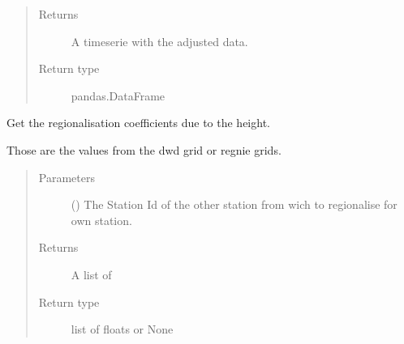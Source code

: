 \documentclass[letterpaper,10pt,english]{sphinxmanual}
\begin{document}
\begin{fulllineitems}
\begin{fulllineitems}
\begin{quote}
\begin{description}
\begin{itemize}
\end{itemize}

\item[{Returns}] \leavevmode
\sphinxAtStartPar
A timeserie with the adjusted data.

\item[{Return type}] \leavevmode
\sphinxAtStartPar
pandas.DataFrame

\end{description}\end{quote}

\end{fulllineitems}


\begin{fulllineitems}
\label{\detokenize{weatherDB:weatherDB.station.StationBase.get_coef}}
\sphinxAtStartPar
Get the regionalisation coefficients due to the height.

\sphinxAtStartPar
Those are the values from the dwd grid or regnie grids.
\begin{quote}\begin{description}
\item[{Parameters}] \leavevmode
\sphinxAtStartPar
{} () \textendash{} The Station Id of the other station from wich to regionalise for own station.

\item[{Returns}] \leavevmode
\sphinxAtStartPar
A list of

\item[{Return type}] \leavevmode
\sphinxAtStartPar
list of floats or None

\end{description}\end{quote}

\end{fulllineitems}



\end{fulllineitems}
\end{document}
